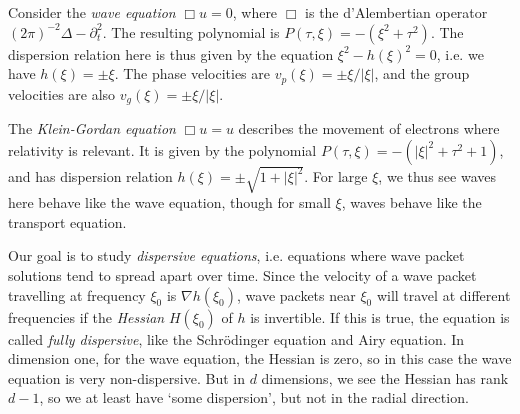\begin{comment}
	\[ ( \widehat{E} ,\widehat{B} ) = e^{t M} (\widehat{E}_0, \widehat{B}_0) \]


	\[ \partial_t \widehat{E} = c^2 (i \xi \times \widehat{B})  \quad \partial_t \widehat{B} = - (i \xi \times \widehat{E}). \]
	Thus if $\widehat{B} = \delta_{\xi_0}$ and $\widehat{E} = \delta_{E_0}$, then
	\[ \partial_t \widehat{E} = c^2 (i \xi \times \xi_0) \]


	\[ L = -i \left( \sum \begin{pmatrix} 0 & 0 & 0 \\ 0 & 0 & - c^2 \\ 0 & c^2 & 0 \end{pmatrix} D_x + \begin{pmatrix} 0 & 0 & c^2 \\ 0 & 0 & 0 \\ -c^2 & 0 & 0 \end{pmatrix} D_y + \begin{pmatrix} 0 & -c^2 & 0 \\ c^2 & 0 & 0 \\ 0 & 0 & 0 \end{pmatrix} D_z \right) \]
\end{example}
\end{comment}

\begin{example}
	Consider the \emph{wave equation} $\Box u = 0$, where $\Box$ is the d'Alembertian operator $(2 \pi)^{-2} \Delta - \partial_t^2$. The resulting polynomial is $P(\tau,\xi) = -(\xi^2 + \tau^2)$. The dispersion relation here is thus given by the equation $\xi^2 - h(\xi)^2 = 0$, i.e. we have $h(\xi) = \pm \xi$. The phase velocities are $v_p(\xi) = \pm \xi / |\xi|$, and the group velocities are also $v_g(\xi) = \pm \xi / |\xi|$.
\end{example}

\begin{example}
	The \emph{Klein-Gordan equation} $\Box u = u$ describes the movement of electrons where relativity is relevant. It is given by the polynomial $P(\tau,\xi) = - (|\xi|^2 + \tau^2 + 1)$, and has dispersion relation $h(\xi) = \pm \sqrt{1 + |\xi|^2}$. For large $\xi$, we thus see waves here behave like the wave equation, though for small $\xi$, waves behave like the transport equation.
\end{example}

Our goal is to study \emph{dispersive equations}, i.e. equations where wave packet solutions tend to spread apart over time. Since the velocity of a wave packet travelling at frequency $\xi_0$ is $\nabla h(\xi_0)$, wave packets near $\xi_0$ will travel at different frequencies if the \emph{Hessian} $H(\xi_0)$ of $h$ is invertible. If this is true, the equation is called \emph{fully dispersive}, like the Schr\"{o}dinger equation and Airy equation. In dimension one, for the wave equation, the Hessian is zero, so in this case the wave equation is very non-dispersive. But in $d$ dimensions, we see the Hessian has rank $d-1$, so we at least have `some dispersion', but not in the radial direction.


